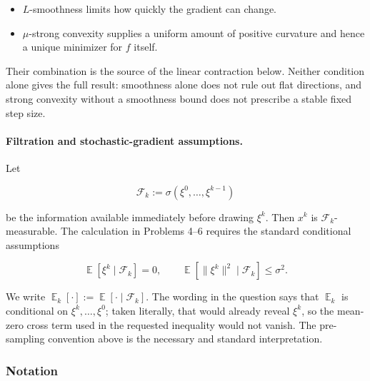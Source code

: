 \documentclass[11pt,a4paper]{article}
\DeclareMathOperator{\E}{\mathbb{E}}
\theoremstyle{definition}
\begin{document}
\begin{itemize}
  \item $L$-smoothness limits how quickly the gradient can change.
  \item $\mu$-strong convexity supplies a uniform amount of positive curvature and hence a unique minimizer for $f$ itself.
\end{itemize}

Their combination is the source of the linear contraction below. Neither condition alone gives the full result: smoothness alone does not rule out flat directions, and strong convexity without a smoothness bound does not prescribe a stable fixed step size.

\paragraph{Filtration and stochastic-gradient assumptions.}
Let

\[
\mathcal{F}_k:=\sigma(\xi^0,\ldots,\xi^{k-1})
\]

be the information available immediately before drawing $\xi^k$. Then $x^k$ is $\mathcal{F}_k$-measurable. The calculation in Problems 4--6 requires the standard conditional assumptions

\[
\E\left[\xi^k\mid\mathcal{F}_k\right]=0,
\qquad
\E\left[\|\xi^k\|^2\mid\mathcal{F}_k\right]\leq\sigma^2.
\]

We write $\E_k[\cdot]:=\E[\cdot\mid\mathcal{F}_k]$. The wording in the question says that $\E_k$ is conditional on $\xi^k,\ldots,\xi^0$; taken literally, that would already reveal $\xi^k$, so the mean-zero cross term used in the requested inequality would not vanish. The pre-sampling convention above is the necessary and standard interpretation.

\subsubsection{Notation}
\end{document}
